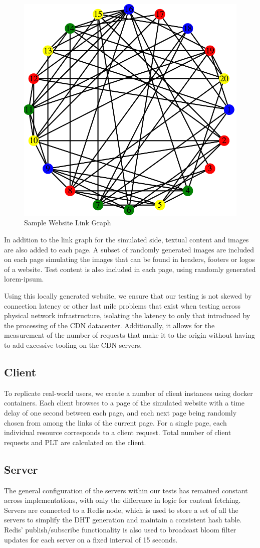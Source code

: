 \documentclass[conference]{IEEEtran}
\begin{document}
\begin{figure}[!h]
	\centering
	\includegraphics[width=0.5\columnwidth]{figures/web_graph}
	\caption{Sample Website Link Graph}\label{fig:web_graph}
\end{figure}

In addition to the link graph for the simulated side, textual content and images are also added to each page.  A subset of randomly generated images are included on each page simulating the  images that can be found in headers, footers or logos of a website.  Test content is also included in each page, using randomly generated lorem-ipsum.

Using this locally generated website, we ensure that our testing is not skewed by connection latency or other last mile problems that exist when testing across physical network infrastructure, isolating the latency to only that introduced by the processing of the CDN datacenter.  Additionally, it allows for the measurement of the number of requests that make it to the origin without having to add excessive tooling on the CDN servers.

\subsection*{Client}
To replicate real-world users, we create a number of client instances using docker containers. Each client browses to a page of the simulated website with a time delay of one second between each page, and each next page being randomly chosen from among the links of the current page. For a single page, each individual resource corresponds to a client request. Total number of client requests and PLT are calculated on the client. 

\subsection*{Server}
The general configuration of the servers within our tests has remained constant across implementations, with only the difference in logic for content fetching.  Servers are connected to a Redis node, which is used to store a set of all the servers to simplify the DHT generation and maintain a consistent hash table.  Redis’ publish/subscribe functionality is also used to broadcast bloom filter updates for each server on a fixed interval of 15 seconds.
\end{document}
